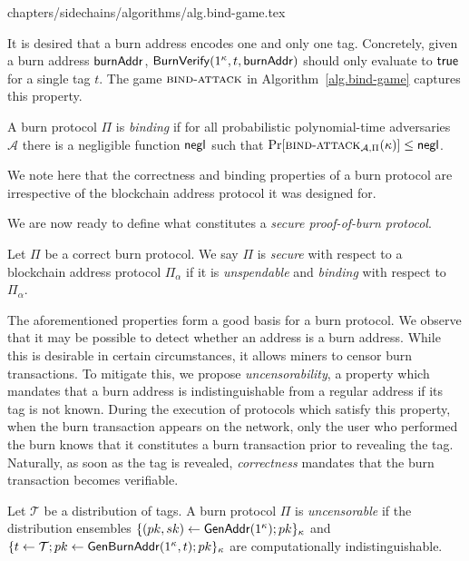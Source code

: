 {chapters/sidechains/algorithms/alg.bind-game.tex}

It is desired that a burn address encodes one and only one tag. Concretely, given a burn address $\mathsf{burnAddr}$, $\mathsf{Burn}\-\mathsf{Verify}(1^\kappa, t, \mathsf{burnAddr})$ should only evaluate to $\textsf{true}$ for a single tag $t$. The game $\textsc{bind}\-\text{-}\-\textsc{attack}$ in Algorithm~\ref{alg.bind-game} captures this property.

\begin{definition}[Binding]
  A burn protocol $\Pi$ is \emph{binding} if
  for all probabilistic polynomial-time adversaries $\mathcal{A}$ there is a
  negligible function $\mathsf{negl}$ such that
  $\Pr[\textsc{bind}\-\text{-}\-\textsc{attack}_{\mathcal{A},\Pi}(\kappa)] \leq \mathsf{negl}$.
\end{definition}

We note here that the correctness and binding properties of a burn protocol are irrespective of the blockchain address protocol it was designed for.

We are now ready to define what constitutes a \emph{secure proof-of-burn protocol}.

\begin{definition}[Security]
  Let $\Pi$ be a correct burn protocol. We say $\Pi$ is \emph{secure} with respect to a blockchain address protocol $\Pi_\alpha$ if it is \emph{unspendable} and \emph{binding} with respect to $\Pi_\alpha$.
\end{definition}

The aforementioned properties form a good basis for a burn protocol. We observe that it may be possible to detect whether an address is a burn address. While this is desirable in certain circumstances, it allows miners to censor burn transactions. To mitigate this, we propose \emph{uncensorability}, a property which mandates that a burn address is indistinguishable from a regular address if its tag is not known. During the execution of protocols which satisfy this property, when the burn transaction appears on the network, only the user who performed the burn knows that it constitutes a burn transaction prior to revealing the tag. Naturally, as soon as the tag is revealed, \emph{correctness} mandates that the burn transaction becomes verifiable.

\begin{definition}[Uncensorability]
  Let $\mathcal{T}$ be a distribution of tags.
  A burn protocol $\Pi$ is \emph{uncensorable} if
  the distribution ensembles $\{(pk, sk) \gets \mathsf{Gen}\-\mathsf{Addr}(1^\kappa); pk\}_\kappa$ and
  $\{t \gets \mathcal{T}; pk \gets \mathsf{Gen}\-\mathsf{Burn}\-\mathsf{Addr}(1^\kappa, t); pk\}_\kappa$ are computationally indistinguishable.
\end{definition}
